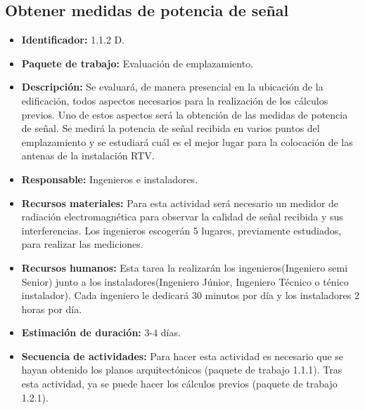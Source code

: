 \subsection{Obtener medidas de potencia de señal}
\begin{itemize}
\item \textbf{Identificador: }1.1.2 D.
\item \textbf{Paquete de trabajo: }Evaluación de emplazamiento.
\item \textbf{Descripción: }Se evaluará, de manera presencial en la ubicación de la edificación, todos aspectos necesarios para la realización de los cálculos previos. Uno de estos aspectos será la obtención de las medidas de potencia de señal. Se medirá la potencia de señal recibida en varios puntos del emplazamiento y se estudiará cuál es el mejor lugar para la colocación de las antenas de la instalación RTV.
\item \textbf{Responsable: }Ingenieros e instaladores.
\item \textbf{Recursos materiales: }Para esta actividad será necesario un medidor de radiación electromagnética para observar la calidad de señal recibida y sus interferencias. Los ingenieros escogerán 5 lugares, previamente estudiados, para realizar las mediciones.
\item \textbf{Recursos humanos: }Esta tarea la realizarán los ingenieros(Ingeniero semi Senior) junto a los instaladores(Ingeniero Júnior, Ingeniero Técnico o ténico instalador). Cada ingeniero le dedicará 30 minutos por día y los instaladores 2 horas por día.
\item \textbf{Estimación de duración: }3-4 días.
\item \textbf{Secuencia de actividades: }Para hacer esta actividad es necesario que se hayan obtenido los planos arquitectónicos (paquete de trabajo 1.1.1). Tras esta actividad, ya se puede hacer los cálculos previos (paquete de trabajo 1.2.1).
\end{itemize}

